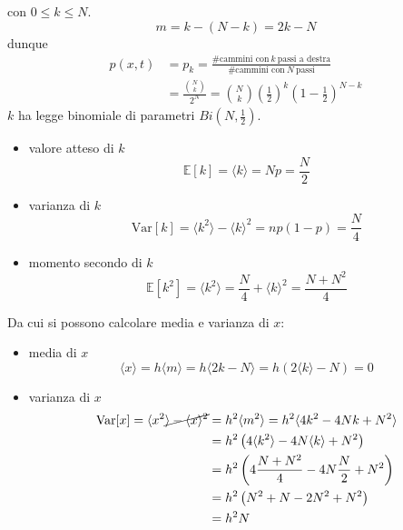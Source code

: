 \documentclass[10pt,a4paper,twoside,openright]{book}
\begin{document}
con $\displaystyle 0\leqslant k\leqslant N$.
\begin{equation*}
m=k-(N-k) =2k-N
\end{equation*}
dunque
\begin{align*}
p(x,t) & =p_{k} =\frac{\text{\#cammini con} \ k\ \text{passi a destra}}{\text{\#cammini con} \ N\ \text{passi}}\\
 & =\frac{\binom{N}{k}}{2^{N}} =\binom{N}{k}\left(\frac{1}{2}\right)^{k}\left(1-\frac{1}{2}\right)^{N-k}
\end{align*}
$k$ ha legge binomiale di parametri $\displaystyle Bi\left(N,\frac{1}{2}\right)$.
\begin{itemize}
\item valore atteso di $k$
\begin{equation*}
\mathbb{E}[k]=\langle k\rangle =Np=\frac{N}{2}
\end{equation*}
\item varianza di $k$
\begin{equation*}
\mathrm{Var}[k]=\langle k^{2} \rangle -\langle k\rangle ^{2} =np(1-p)=\frac{N}{4}
\end{equation*}
\item momento secondo di $k$
\begin{equation*}
\mathbb{E}[k^2]=\langle k^{2} \rangle =\frac{N}{4} +\langle k\rangle ^{2} =\frac{N+N^2}{4}
\end{equation*}
\end{itemize}

Da cui si possono calcolare media e varianza di $x$:
\begin{itemize}
\item media di $x$
\begin{equation*}
\langle x\rangle =h\langle m\rangle =h\langle 2k-N\rangle =h(2\langle k\rangle -N) =0
\end{equation*}
\item varianza di $x$
\begin{align*}
\mathrm{Var}[x]=\langle x^{2} \cancel{\rangle -\langle x \rangle^2}  & =h^{2} \langle m^{2} \rangle =h^{2} \langle 4k^{2} -4Nk+N^{2} \rangle \\
 & =h^{2}\left(4\langle k^{2} \rangle -4N\langle k\rangle +N^{2}\right)\\
 & =h^{2}\left(4 \frac{N+N^2}{4} -4 N \frac{N}{2} + N^2 \right)\\
 & =h^{2}\left(N^{2} +N-2N^{2} +N^{2}\right)\\
 & =h^{2} N
\end{align*}
\end{itemize}
\end{document}
